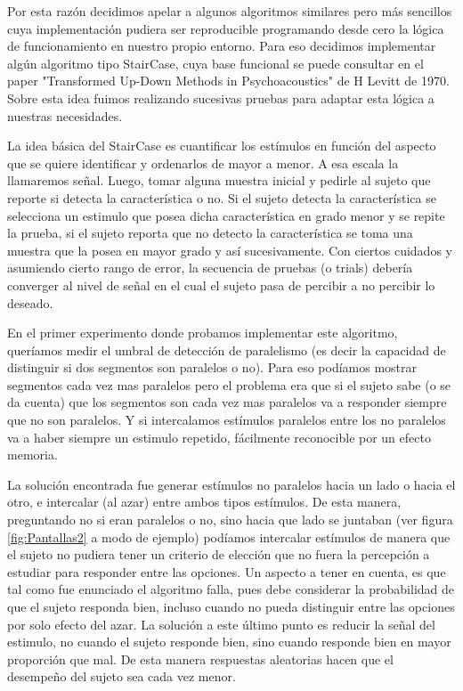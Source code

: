 \documentclass{article}
\begin{document}
    Por esta razón decidimos apelar a algunos algoritmos similares pero más sencillos cuya implementación pudiera ser reproducible programando desde cero la lógica de funcionamiento en nuestro propio entorno. Para eso decidimos implementar algún algoritmo tipo StairCase, cuya base funcional se puede consultar en el paper "Transformed Up-Down Methods in Psychoacoustics"\cite{staircase} de H Levitt de 1970. Sobre esta idea fuimos realizando sucesivas pruebas para adaptar esta lógica a nuestras necesidades. 
    
    La idea básica del StairCase es cuantificar los estímulos en función del aspecto que se quiere identificar y ordenarlos de mayor a menor. A esa escala la llamaremos señal. Luego, tomar alguna muestra inicial y pedirle al sujeto que reporte si detecta la característica o no. Si el sujeto detecta la característica se selecciona un estimulo que posea dicha característica en grado menor y se repite la prueba, si el sujeto reporta que no detecto la característica se toma una muestra que la posea en mayor grado y así sucesivamente. Con ciertos cuidados y asumiendo cierto rango de error, la secuencia de pruebas (o trials) debería converger al nivel de señal en el cual el sujeto pasa de percibir a no percibir lo deseado. 
    
    En el primer experimento donde probamos implementar este algoritmo, queríamos medir el umbral de 
    detección de paralelismo (es decir la capacidad de distinguir si dos segmentos son paralelos o no). Para eso podíamos mostrar segmentos cada vez mas paralelos pero el problema era que si el sujeto sabe (o se da cuenta) que los segmentos son cada vez mas paralelos va a responder siempre que no son paralelos. Y si intercalamos estímulos paralelos entre los no paralelos va a haber siempre un estimulo repetido, fácilmente reconocible por un efecto memoria. 
    
    La solución encontrada fue generar estímulos no paralelos hacia un lado o hacia el otro, e intercalar (al azar) entre ambos tipos estímulos. De esta manera, preguntando no si eran paralelos o no, sino hacia que lado se juntaban (ver figura \ref{fig:Pantallas2} a modo de ejemplo) podíamos intercalar estímulos de manera que el sujeto no pudiera tener un criterio de elección que no fuera la percepción a estudiar para responder entre las opciones. Un aspecto a tener en cuenta, es que tal como fue enunciado el algoritmo falla, pues debe considerar la probabilidad de que el sujeto responda bien, incluso cuando no pueda distinguir entre las opciones por solo efecto del azar. La solución a este último punto es reducir la señal del estimulo, no cuando el sujeto responde bien, sino cuando responde bien en mayor proporción que mal. De esta manera respuestas aleatorias hacen que el desempeño del sujeto sea cada vez menor. 
    
\end{document}
